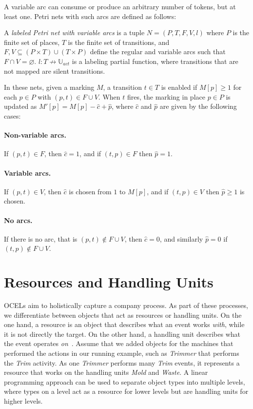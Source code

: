     A variable arc can consume or produce an arbitrary number of tokens, but at least one.
    Petri nets with such arcs are defined as follows:
    \begin{definition}
        A \emph{labeled Petri net with variable arcs} is a tuple $N = (P, T, F, V, l)$ where $P$ is the finite set of places, $T$ is the finite set of transitions, and $F, V \subseteq (P \times T) \cup (T \times P)$ define the regular and variable arcs such that $F \cap V = \varnothing$.
        $l: T \not \to \mathbb{U}_{act}$ is a labeling partial function, where transitions that are not mapped are silent transitions.
    \end{definition}

    In these nets, given a marking $M$, a transition $t \in T$ is enabled if $M[p] \geq 1$ for each $p \in P$ with $(p, t) \in F \cup V$. 
    When $t$ fires, the marking in place $p \in P$ is updated as $M'[p] = M[p] - \hat{c} + \hat{p}$, where $\hat{c}$ and $\hat{p}$ are given by the following cases:

\paragraph{Non-variable arcs.}
If $(p, t) \in F$, then $\hat{c} = 1$, and if $(t, p) \in F$ then $\hat{p} = 1$.

\paragraph{Variable arcs.}
If $(p, t) \in V$, then $\hat{c}$ is chosen from $1$ to $M[p]$, and if $(t, p) \in V$ then $\hat{p} \geq 1$ is chosen.

\paragraph{No arcs.}
If there is no arc, that is $(p, t) \not \in F \cup V$, then $\hat{c} = 0$, and similarly $\hat{p} = 0$ if $(t, p) \not \in F \cup V$.


    
    \section{Resources and Handling Units}
    \label{chap:resources-hus}
    
    OCELs aim to holistically capture a company process.
    As part of these processes, we differentiate between objects that act as resources or handling units.
    On the one hand, a resource is an object that describes what an event works \textit{with}, while it is not directly the target.
    On the other hand, a handling unit describes what the event operates \textit{on}~\autocite{hensen2024}.
    Assume that we added objects for the machines that performed the actions in our running example, such as \emph{Trimmer} that performs the \emph{Trim} activity.
    As one \emph{Trimmer} performs many \emph{Trim} events, it represents a resource that works on the handling units \emph{Mold} and \emph{Waste}.
    A linear programming approach can be used to separate object types into multiple levels, where types on a level act as a resource for lower levels but are handling units for higher levels\autocite{blinded2025}.

